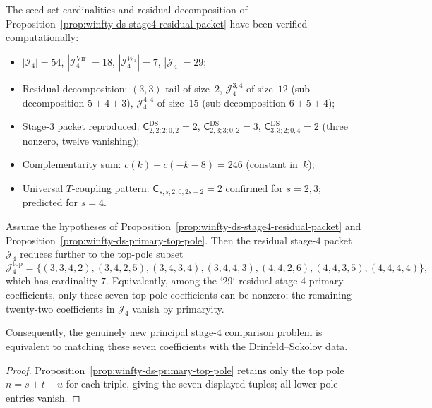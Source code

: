 \begin{computation}
\label{comp:winfty-stage4-seed-verification}
The seed set cardinalities and residual decomposition of
Proposition~\ref{prop:winfty-ds-stage4-residual-packet} have been
verified computationally:
\begin{itemize}
\item $|\mathcal{I}_4| = 54$,
  $|\mathcal{I}_4^{\mathrm{Vir}}| = 18$,
  $|\mathcal{I}_4^{W_3}| = 7$,
  $|\mathcal{J}_4| = 29$;
\item Residual decomposition: $(3,3)$-tail of size~$2$,
  $\mathcal{J}_4^{3,4}$ of size~$12$ (sub-decomposition $5+4+3$),
  $\mathcal{J}_4^{4,4}$ of size~$15$ (sub-decomposition $6+5+4$);
\item Stage-$3$ packet reproduced:
  $\mathsf{C}^{\mathrm{DS}}_{2,2;2;0,2} = 2$,
  $\mathsf{C}^{\mathrm{DS}}_{2,3;3;0,2} = 3$,
  $\mathsf{C}^{\mathrm{DS}}_{3,3;2;0,4} = 2$ (three nonzero,
  twelve vanishing);
\item Complementarity sum:
  $c(k) + c(-k-8) = 246$ (constant in~$k$);
\item Universal $T$-coupling pattern:
  $\mathsf{C}_{s,s;2;0,2s-2} = 2$ confirmed for $s = 2, 3$;
  predicted for $s = 4$.
\end{itemize}
\end{computation}

\begin{corollary}
\label{cor:winfty-ds-stage4-top-pole-packet}
Assume the hypotheses of
Proposition~\ref{prop:winfty-ds-stage4-residual-packet} and
Proposition~\ref{prop:winfty-ds-primary-top-pole}.  Then the residual
stage-$4$ packet $\mathcal{J}_4$ reduces further to the top-pole subset
\[
\mathcal{J}_4^{\mathrm{top}}
=\{(3,3,4,2),(3,4,2,5),(3,4,3,4),(3,4,4,3),
(4,4,2,6),(4,4,3,5),(4,4,4,4)\},
\]
which has cardinality $7$.  Equivalently, among the `29` residual
stage-$4$ primary coefficients, only these seven top-pole coefficients
can be nonzero; the remaining twenty-two coefficients in
$\mathcal{J}_4$ vanish by primaryity.

Consequently, the genuinely new principal stage-$4$ comparison problem
is equivalent to matching these seven coefficients with the
Drinfeld--Sokolov data.
\end{corollary}

\begin{proof}
Proposition~\ref{prop:winfty-ds-primary-top-pole} retains only the top pole $n=s+t-u$ for each triple, giving the seven displayed tuples; all lower-pole entries vanish.
\end{proof}

